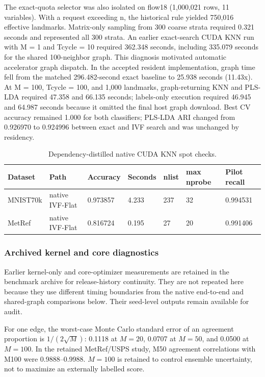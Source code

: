 \documentclass[twoside,11pt]{article}
\begin{document}
\begin{small}
The exact-quota selector was also isolated on flow18 (1,000,021 rows, 11 variables). With a request exceeding n, the historical rule yielded 750,016 effective landmarks. Matrix-only sampling from 300 coarse strata required 0.321 seconds and represented all 300 strata. An earlier exact-search CUDA KNN run with M = 1 and Tcycle = 10 required 362.348 seconds, including 335.079 seconds for the shared 100-neighbor graph. This diagnosis motivated automatic accelerator graph dispatch. In the accepted resident implementation, graph time fell from the matched 296.482-second exact baseline to 25.938 seconds (11.43x). At M = 100, Tcycle = 100, and 1,000 landmarks, graph-returning KNN and PLS-LDA required 47.358 and 66.135 seconds; labels-only execution required 46.945 and 64.987 seconds because it omitted the final host graph download. Best CV accuracy remained 1.000 for both classifiers; PLS-LDA ARI changed from 0.926970 to 0.924996 between exact and IVF search and was unchanged by residency.

\begin{table}[h]
\caption{Dependency-distilled native CUDA KNN spot checks.}
\small
\begin{tabular}{lllllll}
\toprule
Dataset & Path & Accuracy & Seconds & nlist & max nprobe & Pilot recall \\
\midrule
MNIST70k & native IVF-Flat & 0.973857 & 4.233 & 237 & 32 & 0.994531 \\
MetRef & native IVF-Flat & 0.816724 & 0.195 & 27 & 20 & 0.991406 \\
\bottomrule
\end{tabular}
\end{table}

\subsubsection{Archived kernel and core diagnostics}
Earlier kernel-only and core-optimizer measurements are retained in the benchmark archive for release-history continuity. They are not repeated here because they use different timing boundaries from the native end-to-end and shared-graph comparisons below. Their seed-level outputs remain available for audit.

For one edge, the worst-case Monte Carlo standard error of an agreement proportion is $1/(2\sqrt M)$: 0.1118 at $M=20$, 0.0707 at $M=50$, and 0.0500 at $M=100$. In the retained MetRef/USPS study, M50 agreement correlations with M100 were 0.9888--0.9988. $M=100$ is retained to control ensemble uncertainty, not to maximize an externally labelled score.


\end{small}
\end{document}
